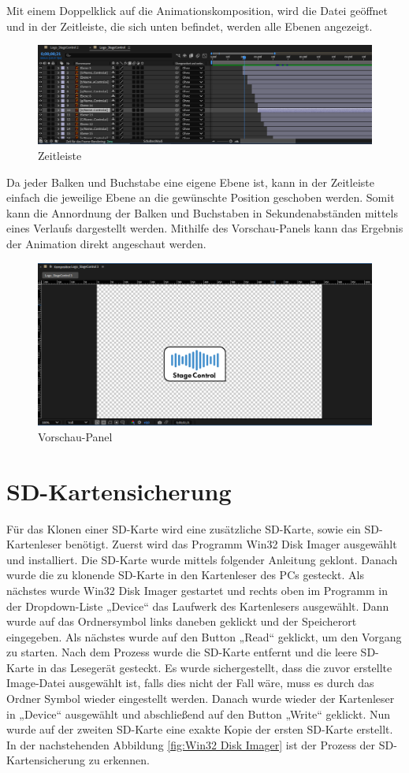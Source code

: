Mit einem Doppelklick auf die Animationskomposition, wird die Datei geöffnet und in der Zeitleiste, die sich unten befindet, werden alle Ebenen angezeigt. 

\begin{figure}[H]
	\centering
	\includegraphics[width=0.5\linewidth]{images/Zeitleiste.png}
	\caption[Zeitleiste]{Zeitleiste}
	\label{fig:Zeitleiste}
\end{figure} 

\newpage
Da jeder Balken und Buchstabe eine eigene Ebene ist, kann in der Zeitleiste einfach die jeweilige Ebene an die gewünschte Position geschoben werden. Somit kann die Annordnung der Balken und Buchstaben in Sekundenabständen mittels eines Verlaufs dargestellt werden. Mithilfe des Vorschau-Panels kann das Ergebnis der Animation direkt angeschaut werden. 

\begin{figure}[H]
	\centering
	\includegraphics[width=0.5\linewidth]{images/Vorschau-Panel.png}
	\caption[Vorschau-Panel]{Vorschau-Panel}
	\label{fig:Vorschau-Panel}
\end{figure} 

\newpage
\section{SD-Kartensicherung}
Für das Klonen einer SD-Karte wird eine zusätzliche SD-Karte, sowie ein SD-Kartenleser benötigt. Zuerst wird das Programm Win32 Disk Imager ausgewählt und installiert. Die SD-Karte wurde mittels folgender Anleitung geklont. \parencite{SD-Kartenklonen}
Danach wurde die zu klonende SD-Karte in den Kartenleser des PCs gesteckt. Als nächstes wurde Win32 Disk Imager gestartet und rechts oben im Programm in der Dropdown-Liste „Device“ das Laufwerk des Kartenlesers ausgewählt. Dann wurde auf das Ordnersymbol links daneben geklickt und der Speicherort eingegeben. Als nächstes wurde auf den Button „Read“ geklickt, um den Vorgang zu starten. Nach dem Prozess wurde die SD-Karte entfernt und die leere SD-Karte in das Lesegerät gesteckt. Es wurde sichergestellt, dass die zuvor erstellte Image-Datei ausgewählt ist, falls dies nicht der Fall wäre, muss es durch das Ordner Symbol wieder eingestellt werden. Danach wurde wieder der Kartenleser in „Device“ ausgewählt und abschließend auf den Button „Write“ geklickt. Nun wurde auf der zweiten SD-Karte eine exakte Kopie der ersten SD-Karte erstellt. In der nachstehenden Abbildung \ref{fig:Win32 Disk Imager} ist der Prozess der SD-Kartensicherung zu erkennen.

